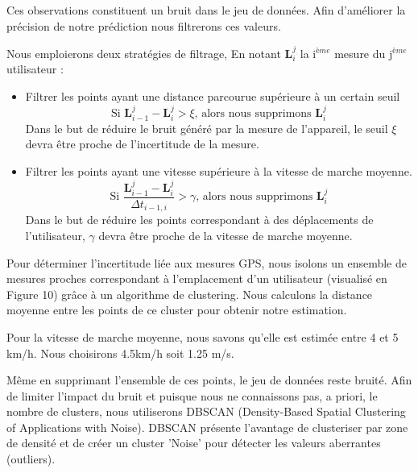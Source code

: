 \documentclass[10pt,a4paper]{article}
\begin{document}
Ces observations constituent un bruit dans le jeu de données. Afin d'améliorer la précision de notre prédiction
nous filtrerons ces valeurs.

\vspace{5mm}

Nous emploierons deux stratégies de filtrage, En notant $\textbf{L}_{i}^{j}$ la $\text{i}^{ème}$ mesure du $\text{j}^{ème}$ utilisateur :
\begin{itemize}[label=\textbullet, font=\LARGE]
    \item Filtrer les points ayant une distance parcourue supérieure à un certain seuil
          \begin{equation}
              \text{Si } \textbf{L}_{i-1}^{j} - \textbf{L}_{i}^{j} > \xi\text{, alors nous supprimons } \textbf{L}_{i}^{j}
          \end{equation}
          Dans le but de réduire le bruit généré par la mesure de l'appareil, le seuil ${\xi}$ devra être proche de l'incertitude de la mesure.
    \item Filtrer les points ayant une vitesse supérieure à la vitesse de marche moyenne.
          \begin{equation}
              \text{Si } \frac{\textbf{L}_{i-1}^{j} - \textbf{L}_{i}^{j}}{\Delta t_{i-1, i}} > \gamma\text{, alors nous supprimons } \textbf{L}_{i}^{j}
          \end{equation}
          Dans le but de réduire les points correspondant à des déplacements de l'utilisateur, ${\gamma}$ devra être proche de la vitesse de marche moyenne.

\end{itemize}

\vspace{5mm}

Pour déterminer l'incertitude liée aux mesures GPS, nous isolons un ensemble de mesures proches correspondant à l'emplacement d'un utilisateur (visualisé en Figure 10) grâce à un algorithme de clustering.
Nous calculons la distance moyenne entre les points de ce cluster pour obtenir notre estimation.

Pour la vitesse de marche moyenne, nous savons qu'elle est estimée entre 4 et 5 km/h. Nous choisirons 4.5km/h soit 1.25 m/s.


\vspace{5mm}

Même en supprimant l'ensemble de ces points, le jeu de données reste bruité. Afin de limiter l'impact du bruit
et puisque nous ne connaissons pas, a priori, le nombre de clusters, nous utiliserons
DBSCAN (Density-Based Spatial Clustering of Applications with Noise). DBSCAN présente l'avantage de clusteriser
par zone de densité et de créer un cluster 'Noise' pour détecter les valeurs aberrantes (outliers).
\end{document}
